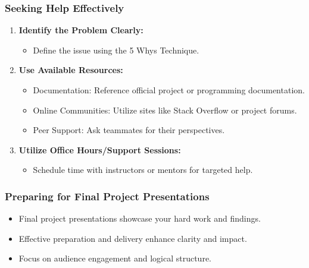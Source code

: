 \documentclass[aspectratio=169]{beamer}
\begin{document}
\begin{frame}[fragile]
    \frametitle{Seeking Help Effectively}
    \begin{enumerate}
        \item \textbf{Identify the Problem Clearly:}
            \begin{itemize}
                \item Define the issue using the 5 Whys Technique.
            \end{itemize}
        \item \textbf{Use Available Resources:}
            \begin{itemize}
                \item Documentation: Reference official project or programming documentation.
                \item Online Communities: Utilize sites like Stack Overflow or project forums.
                \item Peer Support: Ask teammates for their perspectives.
            \end{itemize}
        \item \textbf{Utilize Office Hours/Support Sessions:}
            \begin{itemize}
                \item Schedule time with instructors or mentors for targeted help.
            \end{itemize}
    \end{enumerate}
\end{frame}

\begin{frame}[fragile]
  \frametitle{Preparing for Final Project Presentations}
  \begin{itemize}
      \item Final project presentations showcase your hard work and findings.
      \item Effective preparation and delivery enhance clarity and impact.
      \item Focus on audience engagement and logical structure.
  \end{itemize}
\end{frame}
\end{document}

